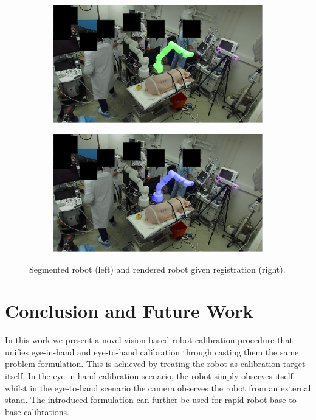 \begin{figure}[tb]
    \centering
    \begin{subfigure}[b]{0.49\textwidth}
        \centering
        \includegraphics[width=\textwidth]{chapter_1/img/left_mask_overlay_0_anonymized.png}
    \end{subfigure}
    \begin{subfigure}[b]{0.49\textwidth}
        \includegraphics[width=\textwidth]{chapter_1/img/left_render_0_anonymized.png}
    \end{subfigure}
    \caption{Segmented robot (left) and rendered robot given registration (right).}
    \label{c1:fig:in_vivo_results}
\end{figure}

\section{Conclusion and Future Work}%
In this work we present a novel vision-based robot calibration procedure that unifies eye-in-hand and eye-to-hand calibration through casting them the same problem formulation. This is achieved by treating the robot as calibration target itself. In the eye-in-hand calibration scenario, the robot simply observes itself whilst in the eye-to-hand scenario the camera observes the robot from an external stand. The introduced formulation can further be used for rapid robot base-to-base calibrations.

